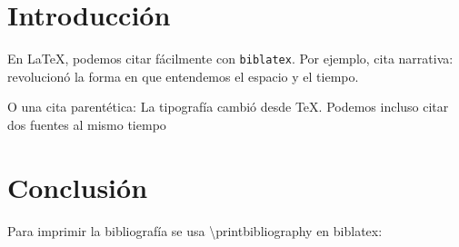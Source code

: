 \documentclass{article}
\begin{document}
\section{Introducción}

En \LaTeX, podemos citar fácilmente con \texttt{biblatex}.
Por ejemplo, cita narrativa:
\cite{einstein1905} revolucionó la forma en que entendemos 
el espacio y el tiempo. 

O una cita parentética:
La tipografía cambió desde \TeX \cite{knuth1984}.
Podemos incluso citar dos fuentes al mismo tiempo \cite{einstein1905,latexproject}

\section{Conclusión}

 Para imprimir la bibliografía se usa \textbackslash printbibliography en biblatex:
 
 
\printbibliography
\end{document}
